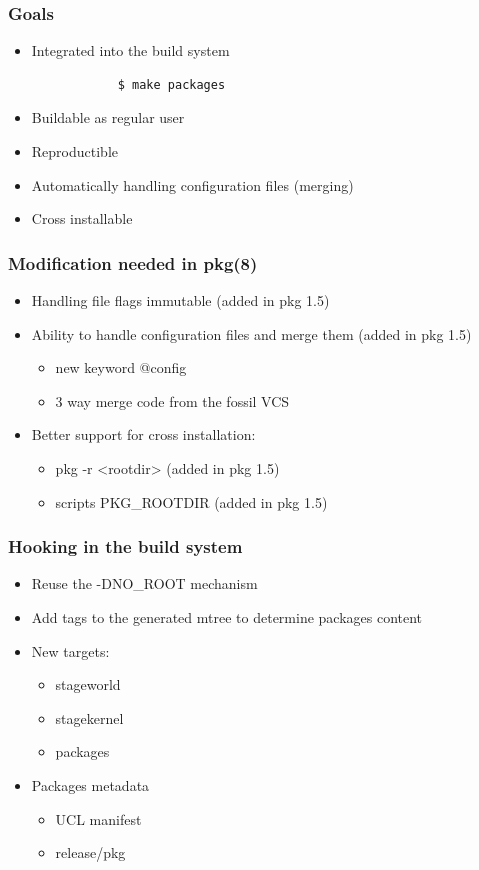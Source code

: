 \begin{frame}[fragile]
	\frametitle{Goals}
	\begin{itemize}
		\item Integrated into the build system
			\begin{lstlisting}
			$ make packages
			\end{lstlisting}
		\item Buildable as regular user
		\item Reproductible
		\item Automatically handling configuration files (merging)
		\item Cross installable
	\end{itemize}
\end{frame}

\begin{frame}
	\frametitle{Modification needed in pkg(8)}
	\begin{itemize}
		\item Handling file flags immutable (added in pkg 1.5)
		\item Ability to handle configuration files and merge them (added in pkg 1.5)
			\begin{itemize}
				\item new keyword @config
				\item 3 way merge code from the fossil VCS
			\end{itemize}
		\item Better support for cross installation:
			\begin{itemize}
				\item pkg -r <rootdir> (added in pkg 1.5)
				\item scripts PKG\_ROOTDIR (added in pkg 1.5)
			\end{itemize}
	\end{itemize}
\end{frame}

\begin{frame}
	\frametitle{Hooking in the build system}
	\begin{itemize}
		\item Reuse the -DNO\_ROOT mechanism
		\item Add tags to the generated mtree to determine packages content
		\item New targets:
			\begin{itemize}
				\item stageworld
				\item stagekernel
				\item packages
			\end{itemize}
		\item Packages metadata
			\begin{itemize}
				\item UCL manifest
				\item release/pkg
			\end{itemize}
	\end{itemize}
\end{frame}

